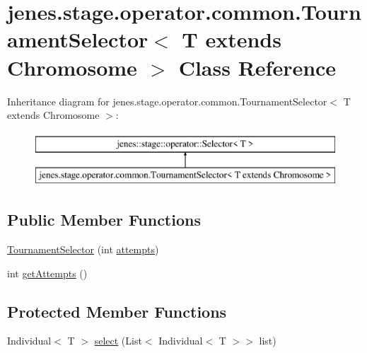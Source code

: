 \hypertarget{classjenes_1_1stage_1_1operator_1_1common_1_1_tournament_selector_3_01_t_01extends_01_chromosome_01_4}{\section{jenes.\-stage.\-operator.\-common.\-Tournament\-Selector$<$ T extends Chromosome $>$ Class Reference}
\label{classjenes_1_1stage_1_1operator_1_1common_1_1_tournament_selector_3_01_t_01extends_01_chromosome_01_4}
}
Inheritance diagram for jenes.\-stage.\-operator.\-common.\-Tournament\-Selector$<$ T extends Chromosome $>$\-:\begin{figure}[H]
\begin{center}
\leavevmode
\includegraphics[height=2.000000cm]{classjenes_1_1stage_1_1operator_1_1common_1_1_tournament_selector_3_01_t_01extends_01_chromosome_01_4}
\end{center}
\end{figure}
\subsection*{Public Member Functions}
\begin{DoxyCompactItemize}
\item 
\hyperlink{classjenes_1_1stage_1_1operator_1_1common_1_1_tournament_selector_3_01_t_01extends_01_chromosome_01_4_a69674739689660dc1926b06a43f2aa6d}{Tournament\-Selector} (int \hyperlink{classjenes_1_1stage_1_1operator_1_1common_1_1_tournament_selector_3_01_t_01extends_01_chromosome_01_4_a4f608252ca95d848b77e3dd8c2a15f93}{attempts})
\item 
int \hyperlink{classjenes_1_1stage_1_1operator_1_1common_1_1_tournament_selector_3_01_t_01extends_01_chromosome_01_4_a93a5d890bc7a8f383bda9791baf0460c}{get\-Attempts} ()
\end{DoxyCompactItemize}
\subsection*{Protected Member Functions}
\begin{DoxyCompactItemize}
\item 
Individual$<$ T $>$ \hyperlink{classjenes_1_1stage_1_1operator_1_1common_1_1_tournament_selector_3_01_t_01extends_01_chromosome_01_4_af18e34c3ad12626eb5d8540e05e9877e}{select} (List$<$ Individual$<$ T $>$$>$ list)
\end{DoxyCompactItemize}
